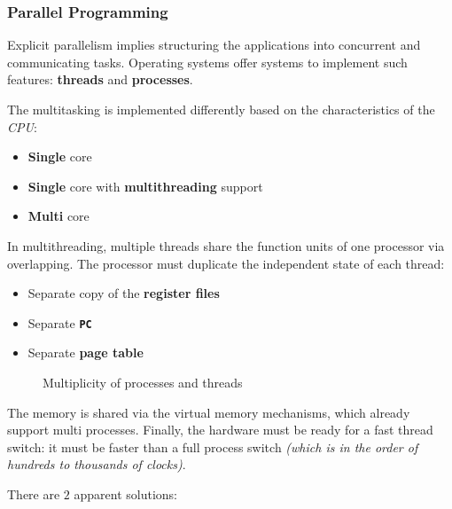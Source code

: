 \documentclass[english]{article}
\begin{document}
\subsubsection{Parallel Programming}

Explicit parallelism implies structuring the applications into concurrent and communicating tasks.
Operating systems offer systems to implement such features: \textbf{threads} and \textbf{processes}.

The multitasking is implemented differently based on the characteristics of the \textit{CPU}:

\begin{itemize}
  \item \textbf{Single} core
  \item \textbf{Single} core with \textbf{multithreading} support
  \item \textbf{Multi} core
\end{itemize}

In multithreading, multiple threads share the function units of one processor via overlapping.
The processor must duplicate the independent state of each thread:

\begin{itemize}
  \item Separate copy of the \textbf{register files}
  \item Separate \textbf{\texttt{PC}}
  \item Separate\textbf{ page table}
\end{itemize}

\begin{figure}[htbp]
  \bigskip
  \centering
  \caption{Multiplicity of processes and threads}
  \label{fig:multiplicity-of-processes-and-threads}
  \bigskip
\end{figure}

The memory is shared via the virtual memory mechanisms, which already support multi processes.
Finally, the hardware must be ready for a fast thread switch: it must be faster than a full process switch \textit{(which is in the order of hundreds to thousands of clocks)}.

There are \(2\) apparent solutions:
\end{document}
